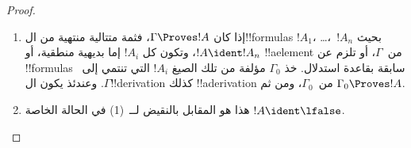 \documentclass[../../../include/open-logic-section]{subfiles}
\begin{document}
\begin{proof}
  \begin{enumerate}
    \item إذا كان $\Gamma \Proves !A$، فثمة متتالية منتهية من
      ال!!{formula}s $!A_1$، \dots،~$!A_n$ بحيث $!A \ident !A_n$، وتكون
      كل $!A_i$ إما بديهية منطقية، أو !!a{element} من~$\Gamma$، أو تلزم
      عن !!{formula}s سابقة بقاعدة استدلال. خذ $\Gamma_0$ مؤلفة من تلك
      الصيغ $!A_i$ التي تنتمي إلى~$\Gamma$. وعندئذ يكون ال!!{derivation}
      كذلك !!a{derivation} من~$\Gamma_0$، ومن ثم
      $\Gamma_0 \Proves !A$.
    \item هذا هو المقابل بالنقيض لــ~(1) في الحالة الخاصة $!A
      \ident \lfalse$.
\end{enumerate}
\end{proof}
\end{document}
